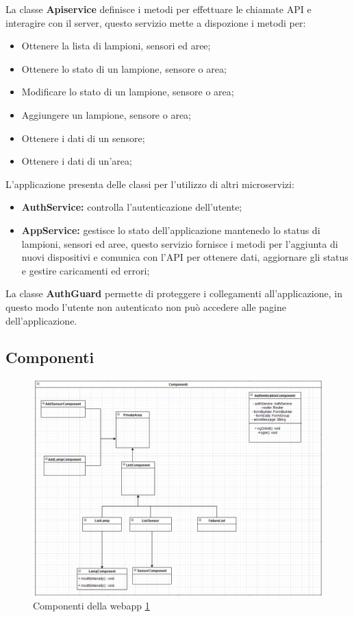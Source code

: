 La classe \textbf{Apiservice} definisce i metodi per effettuare le chiamate API e interagire con il server, questo servizio mette a dispozione i metodi per:
\begin{itemize}
    \item Ottenere la lista di lampioni, sensori ed aree;
    \item Ottenere lo stato di un lampione, sensore o area;
    \item Modificare lo stato di un lampione, sensore o area;
    \item Aggiungere un lampione, sensore o area;
    \item Ottenere i dati di un sensore;
    \item Ottenere i dati di un'area;
\end{itemize}

L'applicazione presenta delle classi per l'utilizzo di altri microservizi:
\begin{itemize}
    \item \textbf{AuthService:} controlla l'autenticazione dell'utente;
    \item \textbf{AppService:} gestisce lo stato dell'applicazione mantenedo lo status di lampioni, sensori ed aree, questo servizio fornisce i metodi per l'aggiunta di nuovi dispositivi e comunica con l'API per ottenere dati, aggiornare gli status e gestire caricamenti ed errori;
\end{itemize}

La classe \textbf{AuthGuard} permette di proteggere i collegamenti all'applicazione, in questo modo l'utente non autenticato non può accedere alle pagine dell'applicazione.

\subsection{Componenti}

\begin{figure}[h]
    \centering
    \includegraphics[width=\textwidth]{img/components_webapp.png}
    \caption{Componenti della webapp \ref{fig:components_webapp}}
    \label{fig:components_webapp}
\end{figure}


